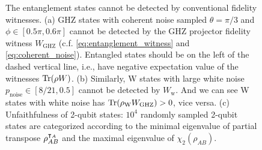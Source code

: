 \documentclass[
aps,
pra,
twocolumn,
floatfix,
]{revtex4-2}
\theoremstyle{plain}
\theoremstyle{definition}
\newcommand{\ew}{W}
\newcommand{\dm}{\rho}
\newcommand{\ghz}{\text{GHZ}}
\newcommand{\noise}{\text{noise}}
\begin{document}
\begin{figure}[!ht]
	\caption{The entanglement states cannot be detected by conventional fidelity witnesses. (a) GHZ states with coherent noise sampled $\theta=\pi/3$ and $\phi\in[0.5\pi,0.6\pi]$ cannot be detected by the GHZ projector fidelity witness $W_{\ghz}$ (c.f. \cref{eq:entanglement_witness} and \cref{eq:coherent_noise}). Entangled states should be on the left of the dashed vertical line, i.e., have negative expectation value of the witnesses $\Tr(\dm\ew)$. (b) Similarly, W states with large white noise $p_{\noise}\in[8/21,0.5]$ cannot be detected by $W_{\text{w}}$. And we can see W states with white noise has $\Tr(\dm_{\text{W}}\ew_{\ghz})>0$, vice versa. (c) Unfaithfulness of 2-qubit states: $10^4$ randomly sampled 2-qubit states are categorized according to the minimal eigenvalue of partial transpose $\dm_{AB}^{\T_A}$ and the maximal eigenvalue of $\chi_2(\dm_{AB})$.}
	\label{fig:conventional_witness}
\end{figure}
\end{document}
